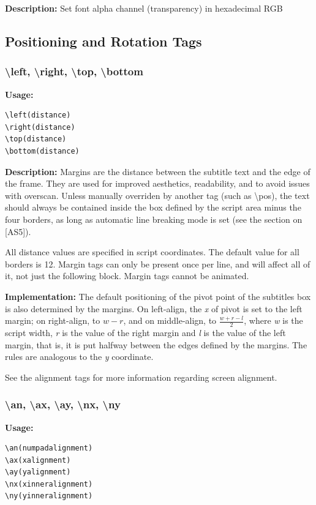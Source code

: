 \documentclass{spec}
\begin{document}
\textbf{Description:}
Set font alpha channel (transparency) in hexadecimal RGB

\subsection{Positioning and Rotation Tags}

\subsubsection{\textbackslash left, \textbackslash right, \textbackslash top, \textbackslash bottom}
\textbf{Usage:}
\begin{verbatim}
\left(distance)
\right(distance)
\top(distance)
\bottom(distance)
\end{verbatim}

\textbf{Description:}
Margins are the distance between the subtitle text and the edge of the frame. They are used for
improved aesthetics, readability, and to avoid issues with overscan. Unless manually overriden
by another tag (such as \textbackslash pos), the text should always be contained inside the box
defined by the script area minus the four borders, as long as automatic line breaking mode is
set (see the section on [AS5]).

All distance values are specified in script coordinates. The default value for all borders is 12.
Margin tags can only be present once per line, and will affect all of it, not just the following
block. Margin tags cannot be animated.

\textbf{Implementation:}
The default positioning of the pivot point of the subtitles box is also determined by the margins.
On left-align, the \emph{x} of pivot is set to the left margin; on right-align, to $w - r$,
and on middle-align, to $\frac{w + r - l}{2}$, where \emph{w} is the script width, \emph{r} is
the value of the right margin and \emph{l} is the value of the left margin, that is, it is put
halfway between the edges defined by the margins. The rules are analogous to the \emph{y} coordinate.

See the alignment tags for more information regarding screen alignment.

\subsubsection{\textbackslash an, \textbackslash ax, \textbackslash ay, \textbackslash nx, \textbackslash ny}
\textbf{Usage:}
\begin{verbatim}
\an(numpadalignment)
\ax(xalignment)
\ay(yalignment)
\nx(xinneralignment)
\ny(yinneralignment)
\end{verbatim}
\end{document}
